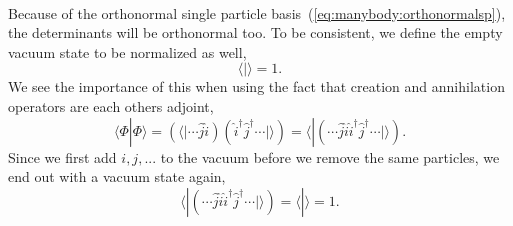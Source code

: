 \paragraph*{}
Because of the orthonormal single particle basis~(\ref{eq:manybody:orthonormalsp}), the determinants will be orthonormal too.
To be consistent, we define the empty vacuum state to be normalized as well,
\begin{equation}
\langle | \rangle = 1 .
\end{equation}
We see the importance of this when using the fact that creation and annihilation operators are each others adjoint,
\begin{equation}
\langle \Phi | \Phi \rangle = 
\left( \langle | \cdots \hat{j} \hat{i} \right) \left( \hat{i}^{\dagger} \hat{j}^{\dagger} \cdots | \rangle \right) =
 \langle | \left(  \cdots \hat{j} \hat{i}\hat{i}^{\dagger} \hat{j}^{\dagger} \cdots | \rangle \right)  .
\end{equation}
Since we first add $i,j,...$ to the vacuum before we remove the same particles, we end out with a vacuum state again,
\begin{equation}
 \langle | \left(  \cdots \hat{j} \hat{i}\hat{i}^{\dagger} \hat{j}^{\dagger} \cdots | \rangle \right) = 
 \langle | \rangle = 1 .
\end{equation}

